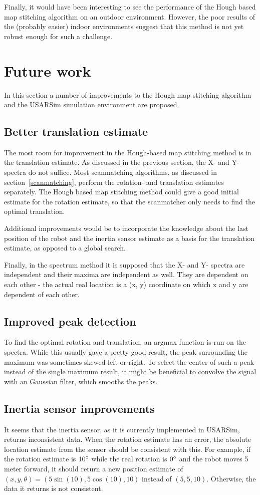 Finally, it would have been interesting to see the performance of the Hough based map stitching algorithm on an outdoor environment. However, the poor results of the (probably easier) indoor environments suggest that this method is not yet robust enough for such a challenge.

\section{Future work}
In this section a number of improvements to the Hough map stitching algorithm and the USARSim simulation environment are proposed. 

\subsection{Better translation estimate}
The most room for improvement in the Hough-based map stitching method is in the translation estimate. As discussed in the previous section, the X- and Y-spectra do not suffice. Most scanmatching algorithms, as discussed in section~\ref{scanmatching}, perform the rotation- and translation estimates separately. The Hough based map stitching method could give a good initial estimate for the rotation estimate, so that the scanmatcher only needs to find the optimal translation. 

Additional improvements would be to incorporate the knowledge about the last position of the robot and the inertia sensor estimate as a basis for the translation estimate, as opposed to a global search. 

Finally, in the spectrum method it is supposed that the X- and Y- spectra are independent and their maxima are independent as well. They are dependent on each other - the actual real location is a (x, y) coordinate on which x and y are dependent of each other.

\subsection{Improved peak detection}
To find the optimal rotation and translation, an argmax function is run on the spectra. While this usually gave a pretty good result, the peak surrounding the maximum was sometimes skewed left or right. To select the center of such a peak instead of the single maximum result, it might be beneficial to convolve the signal with an Gaussian filter, which smooths the peaks.

\subsection{Inertia sensor improvements}
It seems that the inertia sensor, as it is currently implemented in USARSim, returns inconsistent data. When the rotation estimate has an error, the absolute location estimate from the sensor should be consistent with this. For example, if the rotation estimate is $10\degree$ while the real rotation is $0\degree$ and the robot moves 5 meter forward, it should return a new position estimate of $(x, y, \theta) = (5 \sin(10), 5 \cos(10), 10)$ instead of $(5, 5, 10)$. Otherwise, the data it returns is not consistent.

